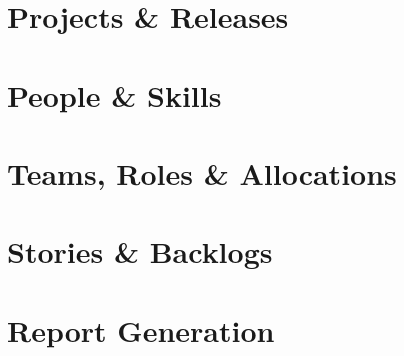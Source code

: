 \documentclass[11pt,fleqn]{book} %
\begin{document}
\section{Projects \& Releases}
\section{People \& Skills}
\section{Teams, Roles \& Allocations}
\section{Stories \& Backlogs}
\section{Report Generation}
\end{document}
